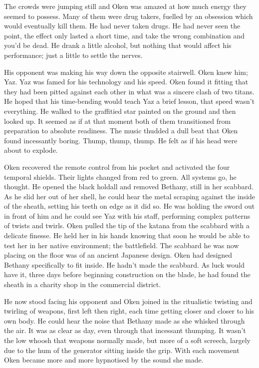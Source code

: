 The crowds were jumping still and Oken was amazed at how much energy they seemed to possess. Many of them were drug takers, fuelled by an obsession which would eventually kill them. He had never taken drugs. He had never seen the point, the effect only lasted a short time, and take the wrong combination and you'd be dead. He drank a little alcohol, but nothing that would affect his performance; just a little to settle the nerves.

His opponent was making his way down the opposite stairwell. Oken knew him; Yaz. Yaz was famed for his technology and his speed. Oken found it fitting that they had been pitted against each other in what was a sincere clash of two titans. He hoped that his time-bending would teach Yaz a brief lesson, that speed wasn't everything. He walked to the graffitied star painted on the ground and then looked up. It seemed as if at that moment both of them transitioned from preparation to absolute readiness. The music thudded a dull beat that Oken found incessantly boring. Thump, thump, thump. He felt as if his head were about to explode.

Oken recovered the remote control from his pocket and activated the four temporal shields. Their lights changed from red to green. All systems go, he thought. He opened the black holdall and removed Bethany, still in her scabbard. As he slid her out of her shell, he could hear the metal scraping against the inside of the sheath, setting his teeth on edge as it did so. He was holding the sword out in front of him and he could see Yaz with his staff, performing complex patterns of twists and twirls. Oken pulled the tip of the katana from the scabbard with a delicate finesse. He held her in his hands knowing that soon he would be able to test her in her native environment; the battlefield. The scabbard he was now placing on the floor was of an ancient Japanese design. Oken had designed Bethany specifically to fit inside. He hadn't made the scabbard. As luck would have it, three days before beginning construction on the blade, he had found the sheath in a charity shop in the commercial district.

He now stood facing his opponent and Oken joined in the ritualistic twisting and twirling of weapons, first left then right, each time getting closer and closer to his own body. He could hear the noise that Bethany made as she whisked through the air. It was as clear as day, even through that incessant thumping. It wasn't the low whoosh that weapons normally made, but more of a soft screech, largely due to the hum of the generator sitting inside the grip. With each movement Oken became more and more hypnotised by the sound she made.

